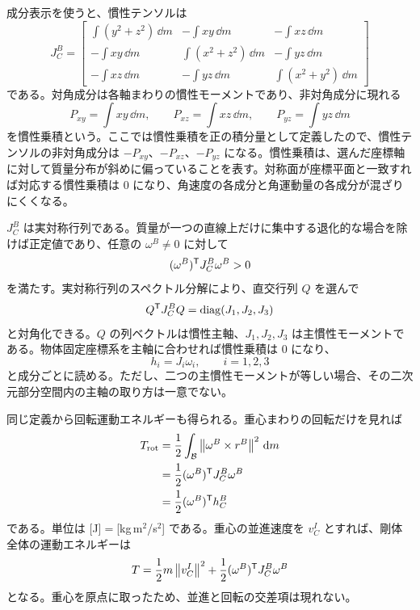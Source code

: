 成分表示を使うと、慣性テンソルは
\begin{equation}
  J_C^B=
  \begin{bmatrix}
    \displaystyle\int(y^2+z^2)\,\dd m&
    \displaystyle-\int xy\,\dd m&
    \displaystyle-\int xz\,\dd m\\[1.0ex]
    \displaystyle-\int xy\,\dd m&
    \displaystyle\int(x^2+z^2)\,\dd m&
    \displaystyle-\int yz\,\dd m\\[1.0ex]
    \displaystyle-\int xz\,\dd m&
    \displaystyle-\int yz\,\dd m&
    \displaystyle\int(x^2+y^2)\,\dd m
  \end{bmatrix}
\end{equation}
である。対角成分は各軸まわりの慣性モーメントであり、非対角成分に現れる
\begin{equation}
  P_{xy}=\int xy\,\dd m,\qquad
  P_{xz}=\int xz\,\dd m,\qquad
  P_{yz}=\int yz\,\dd m
\end{equation}
を慣性乗積という。ここでは慣性乗積を正の積分量として定義したので、慣性テンソルの非対角成分は $-P_{xy}$、$-P_{xz}$、$-P_{yz}$ になる。慣性乗積は、選んだ座標軸に対して質量分布が斜めに偏っていることを表す。対称面が座標平面と一致すれば対応する慣性乗積は 0 になり、角速度の各成分と角運動量の各成分が混ざりにくくなる。

$J_C^B$ は実対称行列である。質量が一つの直線上だけに集中する退化的な場合を除けば正定値であり、任意の $\omega^B\ne0$ に対して
\begin{equation}
  (\omega^B)^{\mathsf{T}} J_C^B\omega^B>0
\end{equation}
を満たす。実対称行列のスペクトル分解により、直交行列 $Q$ を選んで
\begin{equation}
  Q^{\mathsf{T}} J_C^B Q
  =
  \operatorname{diag}(J_1,J_2,J_3)
\end{equation}
と対角化できる。$Q$ の列ベクトルは慣性主軸、$J_1,J_2,J_3$ は主慣性モーメントである。物体固定座標系を主軸に合わせれば慣性乗積は 0 になり、
\begin{equation}
  h_i=J_i\omega_i,\qquad i=1,2,3
\end{equation}
と成分ごとに読める。ただし、二つの主慣性モーメントが等しい場合、その二次元部分空間内の主軸の取り方は一意でない。

同じ定義から回転運動エネルギーも得られる。重心まわりの回転だけを見れば
\begin{align}
  T_\mathrm{rot}
  &=
  \frac{1}{2}
  \int_{\mathcal{B}}
    \left\|\omega^B\times r^B\right\|^2\,\mathrm{d} m\\
  &=
  \frac{1}{2}(\omega^B)^{\mathsf{T}} J_C^B\omega^B\\
  &=
  \frac{1}{2}(\omega^B)^{\mathsf{T}} h_C^B
\end{align}
である。単位は [J]$=$[kg\,m$^2$/s$^2$] である。重心の並進速度を $v_C^I$ とすれば、剛体全体の運動エネルギーは
\begin{equation}
  T=
  \frac{1}{2}m\left\|v_C^I\right\|^2
  +
  \frac{1}{2}(\omega^B)^{\mathsf{T}} J_C^B\omega^B
\end{equation}
となる。重心を原点に取ったため、並進と回転の交差項は現れない。

